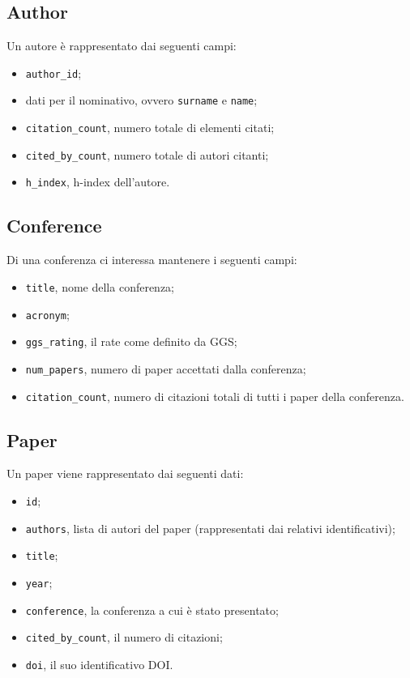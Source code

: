 \subsection{Author}
Un autore è rappresentato dai seguenti campi:
\begin{itemize}
  \item \texttt{author\_id};
  \item dati per il nominativo, ovvero \texttt{surname} e \texttt{name};
  \item \texttt{citation\_count}, numero totale di elementi citati;
  \item \texttt{cited\_by\_count}, numero totale di autori citanti;
  \item \texttt{h\_index}, h-index dell'autore.
\end{itemize}

\subsection{Conference}

Di una conferenza ci interessa mantenere i seguenti campi:
\begin{itemize}
  \item \texttt{title}, nome della conferenza;
  \item \texttt{acronym};
  \item \texttt{ggs\_rating}, il rate come definito da GGS;
  \item \texttt{num\_papers}, numero di paper accettati dalla conferenza;
  \item \texttt{citation\_count}, numero di citazioni totali di tutti i paper della conferenza.
\end{itemize}

\subsection{Paper}

Un paper viene rappresentato dai seguenti dati:

\begin{itemize}
  \item \texttt{id};
  \item \texttt{authors}, lista di autori del paper (rappresentati dai relativi identificativi);
  \item \texttt{title};
  \item \texttt{year};
  \item \texttt{conference}, la conferenza a cui è stato presentato;
  \item \texttt{cited\_by\_count}, il numero di citazioni;
  \item \texttt{doi}, il suo identificativo DOI.
\end{itemize}

